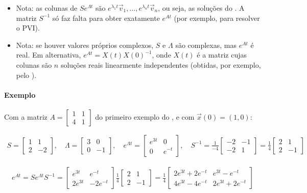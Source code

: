 \documentclass{article}
\begin{document}
\begin{itemize}
    \item Nota: as colunas de $S e^{\Lambda t}$ são $e^{\lambda_1 t}\vec{v}_1, \ldots, e^{\lambda_n t}\vec{v}_n$,
    ou seja, as soluções do . A matriz $S^{-1}$ só faz falta
    para obter exatamente $e^{At}$ (por exemplo, para resolver o PVI).
    \item Nota: se houver valores próprios complexos, $S$ e $\Lambda$ são complexas, mas $e^{At}$ é real.
    Em alternativa, $e^{At} = X(t) X(0)^{-1}$, onde $X(t)$ é a matriz cujas colunas são $n$ soluções reais
    linearmente independentes (obtidas, por exemplo, pelo ).
\end{itemize}

\paragraph{Exemplo}

Com a matriz $A = \begin{bmatrix} 1 & 1 \\ 4 & 1 \end{bmatrix}$ do primeiro exemplo do
, e com $\vec{x}(0) = (1, 0)$:

\begin{gather*}
S =
\begin{bmatrix}
1 & 1 \\
2 & -2
\end{bmatrix},
\quad
\Lambda =
\begin{bmatrix}
3 & 0 \\
0 & -1
\end{bmatrix},
\quad
e^{\Lambda t} =
\begin{bmatrix}
e^{3t} & 0 \\
0 & e^{-t}
\end{bmatrix},
\quad
S^{-1} = \frac{1}{-4}
\begin{bmatrix}
-2 & -1 \\
-2 & 1
\end{bmatrix}
= \frac{1}{4}
\begin{bmatrix}
2 & 1 \\
2 & -1
\end{bmatrix}
\end{gather*}

\begin{gather*}
e^{At} = S e^{\Lambda t} S^{-1} =
\begin{bmatrix}
e^{3t} & e^{-t} \\
2e^{3t} & -2e^{-t}
\end{bmatrix}
\frac{1}{4}
\begin{bmatrix}
2 & 1 \\
2 & -1
\end{bmatrix}
= \frac{1}{4}
\begin{bmatrix}
2e^{3t} + 2e^{-t} & e^{3t} - e^{-t} \\
4e^{3t} - 4e^{-t} & 2e^{3t} + 2e^{-t}
\end{bmatrix}
\end{gather*}
\end{document}
